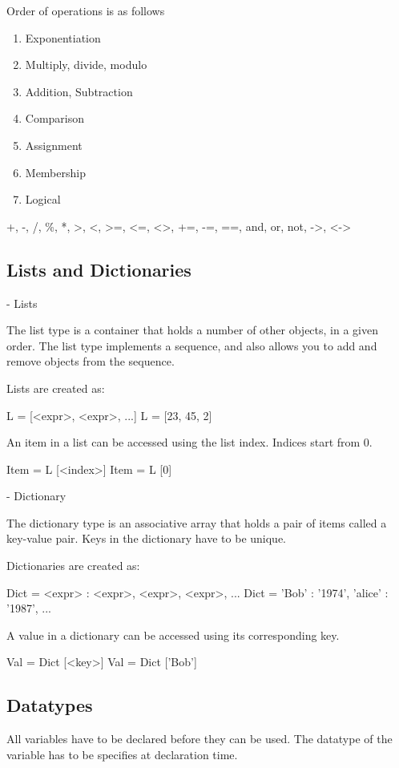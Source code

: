 Order of operations is as follows 
\begin{enumerate}
\item Exponentiation
\item Multiply, divide, modulo
\item Addition, Subtraction
\item Comparison
\item Assignment
\item Membership
\item Logical
\end{enumerate}

+, -, /, \%, *, >, <, >=, <=, <>, +=, -=, ==, and, or, not, ->, <->

\subsection{Lists and Dictionaries}

- Lists

The list type is a container that holds a number of other objects, in a given order.
The list type implements a sequence, and also allows you to add and remove objects from the sequence.

Lists are created as:

L = [<expr>, <expr>, ...]
L = [23, 45, 2]

An item in a list can be accessed using the list index. Indices start from 0.

Item = L [<index>]
Item = L [0]



- Dictionary

The dictionary type is an associative array that holds a pair of items called a key-value pair.
Keys in the dictionary have to be unique.

Dictionaries are created as:

Dict = {<expr> : <expr>, <expr>, <expr>, ...}
Dict = { 'Bob' : '1974', 'alice' : '1987', ...}

A value in a dictionary can be accessed using its corresponding key.

Val = Dict [<key>]
Val = Dict ['Bob']




\subsection{Datatypes}

All variables have to be declared before they can be used. The datatype of the variable has to be specifies at declaration time.


